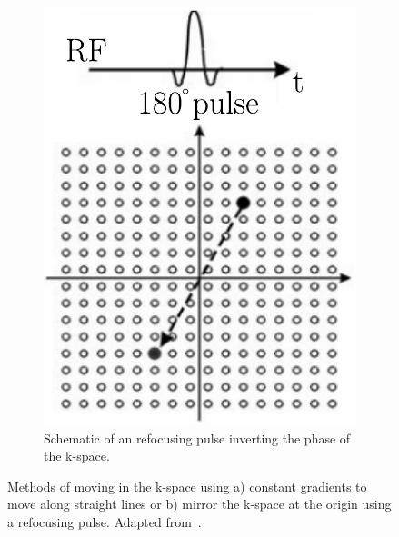 \begin{figure}[h]
\begin{subfigure}{0.445\textwidth}
    		\includegraphics[width=\textwidth]{./Images/RefocusingPulse.pdf}
    		\caption{Schematic of an refocusing pulse inverting the phase of the k-space.}
    		\label{fig:refocusing_k-sapce_pulse}
	\end{subfigure}
	\caption{Methods of moving in the k-space using a) constant gradients to move along straight lines or b) mirror the k-space at the origin using a refocusing pulse. Adapted from~\cite{SamplingStrategies}.}
	\label{fig:kSpaceTrajectories}
\end{figure}

